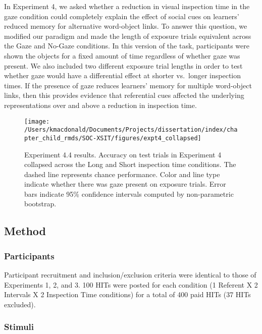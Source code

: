 \documentclass[oneside]{report}
\begin{document}
In Experiment 4, we asked whether a reduction in visual inspection time
in the gaze condition could completely explain the effect of social cues
on learners' reduced memory for alternative word-object links. To answer
this question, we modified our paradigm and made the length of exposure
trials equivalent across the Gaze and No-Gaze conditions. In this
version of the task, participants were shown the objects for a fixed
amount of time regardless of whether gaze was present. We also included
two different exposure trial lengths in order to test whether gaze would
have a differential effect at shorter vs.~longer inspection times. If
the presence of gaze reduces learners' memory for multiple word-object
links, then this provides evidence that referential cues affected the
underlying representations over and above a reduction in inspection
time.
\begin{figure}[t]

{\centering \texttt{[image: /Users/kmacdonald/Documents/Projects/dissertation/index/chapter\_child\_rmds/SOC-XSIT/figures/expt4\_collapsed]} 

}

\caption[Experiment 4.4 results]{Experiment 4.4 results. Accuracy on test trials in Experiment 4 collapsed across the Long and Short inspection time conditions. The dashed line represents chance performance. Color and line type indicate whether there was gaze present on exposure trials. Error bars indicate 95\% confidence intervals computed by non-parametric bootstrap.}\label{fig:expt4-plot}
\end{figure}
\hypertarget{method-3}{%
\subsection{Method}\label{method-3}}

\hypertarget{participants-3}{%
\subsubsection{Participants}\label{participants-3}}

Participant recruitment and inclusion/exclusion criteria were identical
to those of Experiments 1, 2, and 3. 100 HITs were posted for each
condition (1 Referent X 2 Intervals X 2 Inspection Time conditions) for
a total of 400 paid HITs (37 HITs excluded).

\hypertarget{stimuli-3}{%
\subsubsection{Stimuli}\label{stimuli-3}}
\end{document}
